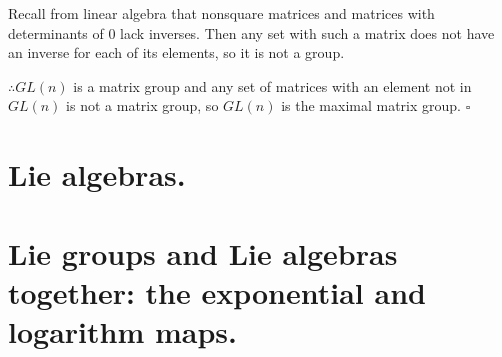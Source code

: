 \documentclass[12pt]{article}
\begin{document}
\vspace{6pt}
\par{Recall from linear algebra that nonsquare
matrices and matrices with determinants of $0$
lack inverses. Then any set with such a matrix
does not have an inverse for each of its elements,
so it is not a group.}

\par{$\therefore GL(n)$ is a matrix group and any set
of matrices with an element not in $GL(n)$ is not
a matrix group, so $GL(n)$ is the maximal matrix
group. $\square$}

\par{\textbf{}}

\section{Lie algebras.}

\section{Lie groups and Lie algebras together: the exponential and logarithm maps.}
\end{document}
